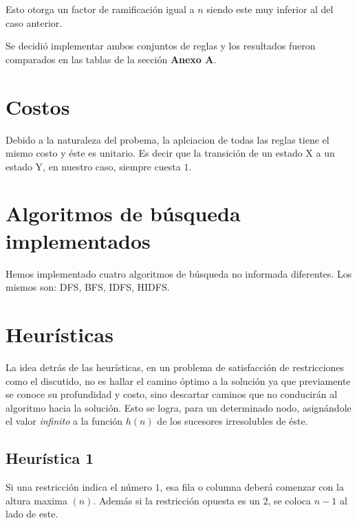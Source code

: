 \documentclass[%
    final,
    reprint,
    notitlepage,
    narroweqnarray,
    inline,
    twoside,
    invited
    ]{ieee}
\begin{document}
\par Esto otorga un factor de ramificación igual a $n$ siendo este muy inferior al del caso anterior. \\
\par Se decidió implementar ambos conjuntos de reglas y los resultados fueron comparados en las tablas de la sección \textbf{Anexo A}.

\section{Costos}

\par Debido a la naturaleza del probema, la aplciacion de todas las reglas tiene el mismo costo y éste es unitario. Es decir que la transición de un estado X a un estado Y, en nuestro caso, siempre cuesta $1$.

\section{Algoritmos de búsqueda implementados}

\par Hemos implementado cuatro algoritmos de búsqueda no informada diferentes. Los mismos son: DFS, BFS, IDFS, HIDFS.

\section{Heurísticas}

\par La idea detrás de las heurísticas, en un  problema de satisfacción de restricciones como el discutido, no es hallar el camino óptimo a la solución ya que previamente se conoce su profundidad y  costo,  sino descartar caminos que no conducirán al algoritmo hacia la solución. Esto se logra, para un determinado nodo, asignándole el valor \textit{infinito} a la función $h(n)$ de los sucesores irresolubles de éste.\\

\subsection{Heurística 1}

\par Si una restricción indica el número $1$, esa fila o columna deberá comenzar con la altura maxima $(n)$. Además si la restricción opuesta es un $2$, se coloca $n-1$ al lado de este.
\end{document}
